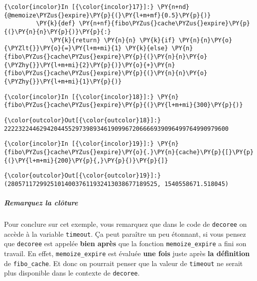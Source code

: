     \begin{Verbatim}[commandchars=\\\{\}]
{\color{incolor}In [{\color{incolor}17}]:} \PY{n+nd}{@memoize\PYZus{}expire}\PY{p}{(}\PY{l+m+mf}{0.5}\PY{p}{)}
         \PY{k}{def} \PY{n+nf}{fibo\PYZus{}cache\PYZus{}expire}\PY{p}{(}\PY{n}{n}\PY{p}{)}\PY{p}{:}
             \PY{k}{return} \PY{n}{n} \PY{k}{if} \PY{n}{n}\PY{o}{\PYZlt{}}\PY{o}{=}\PY{l+m+mi}{1} \PY{k}{else} \PY{n}{fibo\PYZus{}cache\PYZus{}expire}\PY{p}{(}\PY{n}{n}\PY{o}{\PYZhy{}}\PY{l+m+mi}{2}\PY{p}{)}\PY{o}{+}\PY{n}{fibo\PYZus{}cache\PYZus{}expire}\PY{p}{(}\PY{n}{n}\PY{o}{\PYZhy{}}\PY{l+m+mi}{1}\PY{p}{)}
\end{Verbatim}


    \begin{Verbatim}[commandchars=\\\{\}]
{\color{incolor}In [{\color{incolor}18}]:} \PY{n}{fibo\PYZus{}cache\PYZus{}expire}\PY{p}{(}\PY{l+m+mi}{300}\PY{p}{)}
\end{Verbatim}


\begin{Verbatim}[commandchars=\\\{\}]
{\color{outcolor}Out[{\color{outcolor}18}]:} 222232244629420445529739893461909967206666939096499764990979600
\end{Verbatim}
            
    \begin{Verbatim}[commandchars=\\\{\}]
{\color{incolor}In [{\color{incolor}19}]:} \PY{n}{fibo\PYZus{}cache\PYZus{}expire}\PY{o}{.}\PY{n}{cache}\PY{p}{[}\PY{p}{(}\PY{l+m+mi}{200}\PY{p}{,}\PY{p}{)}\PY{p}{]}
\end{Verbatim}


\begin{Verbatim}[commandchars=\\\{\}]
{\color{outcolor}Out[{\color{outcolor}19}]:} (280571172992510140037611932413038677189525, 1540558671.518045)
\end{Verbatim}
            
    \hypertarget{remarquez-la-cluxf4ture}{%
\subparagraph{Remarquez la clôture}\label{remarquez-la-cluxf4ture}}

    Pour conclure sur cet exemple, vous remarquez que dans le code de
\texttt{decoree} on accède à la variable \texttt{timeout}. Ça peut
paraître un peu étonnant, si vous pensez que \texttt{decoree} est
appelée \textbf{bien après} que la fonction \texttt{memoize\_expire} a
fini son travail. En effet, \texttt{memoize\_expire} est évaluée
\textbf{une fois} juste après \textbf{la définition} de
\texttt{fibo\_cache}. Et donc on pourrait penser que la valeur de
\texttt{timeout} ne serait plus disponible dans le contexte de
\texttt{decoree}.

